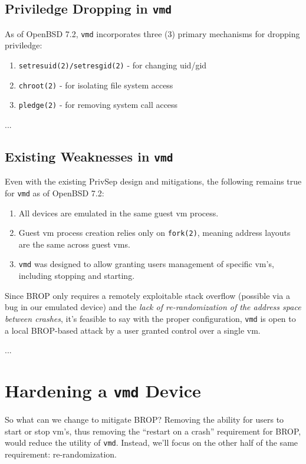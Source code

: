 \documentclass[conference]{IEEEtran}
\begin{document}
\subsection{Priviledge Dropping in \texttt{vmd}}
As of OpenBSD 7.2, \texttt{vmd} incorporates three (3) primary
mechanisms for dropping priviledge:

\begin{enumerate}
\item \texttt{setresuid(2)/setresgid(2)} - for changing uid/gid
\item \texttt{chroot(2)} - for isolating file system access
\item \texttt{pledge(2)} - for removing system call access
\end{enumerate}

...

\subsection{Existing Weaknesses in \texttt{vmd}}
Even with the existing PrivSep design and mitigations, the following
remains true for \texttt{vmd} as of OpenBSD 7.2:

\begin{enumerate}
\item All devices are emulated in the same guest vm process.
\item Guest vm process creation relies only on \texttt{fork(2)}, meaning address layouts are the same across guest vms.
\item \texttt{vmd} was designed to allow granting users management of specific vm's, including stopping and starting.
\end{enumerate}

Since BROP only requires a remotely exploitable stack overflow (possible via a bug in our emulated device) and the \emph{lack of re-randomization of the address space between crashes}, it's feasible to say with the proper configuration, \texttt{vmd} is open to a local BROP-based attack by a user granted control over a single vm.

...

\section{Hardening a \texttt{vmd} Device}
So what can we change to mitigate BROP? Removing the ability for users to start or stop vm's, thus removing the ``restart on a crash'' requirement for BROP, would reduce the utility of \texttt{vmd}. Instead, we'll focus on the other half of the same requirement: re-randomization.
\end{document}
